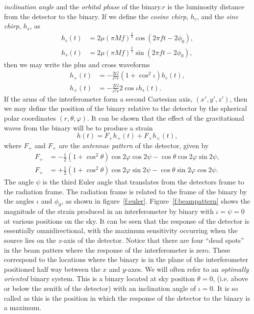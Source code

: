 \emph{inclination angle} and the \emph{orbital phase} of the binary.$r$ is the
luminosity distance from the detector to the binary.  If we define the
\emph{cosine chirp}, $h_c$,  and the \emph{sine chirp}, $h_s$, as 
\begin{align}
h_c(t) & = 2\mu (\pi M f)^{\frac{2}{3}} \cos(2\pi f t - 2\phi_0), \\
h_s(t) & = 2\mu (\pi M f)^{\frac{2}{3}} \sin(2\pi f t - 2\phi_0),
\end{align}
then we may write the plus and cross waveforms
\begin{align}
h_+(t) &= - \frac{2G}{c^2 r} (1 + \cos^2\iota) h_c(t), \\
h_\times(t) &= - \frac{2G}{c^2 r} 2\cos\iota h_s(t).
\end{align}
If the arms of the interferometer form a second Cartesian axis, $(x',y',z')$,
then we may define the position of the binary relative to the detector by the
spherical polar coordinates $(r,\theta,\varphi)$. It can be shown that the
effect of the gravitational waves from the binary will be to produce a
strain\cite{1987MNRAS.224..131S}
\begin{equation}
h(t) = F_+ h_+(t) + F_\times h_\times(t),
\end{equation}
where $F_+$ and $F_\times$ are the \emph{antennae pattern} of the detector,
given by
\begin{align}
F_+ &= -\frac{1}{2}(1 + \cos^2\theta) \cos 2\varphi \cos 2 \psi - 
\cos\theta \cos 2\varphi \sin 2\psi, \\
F_\times &= +\frac{1}{2}( 1 + \cos^2 \theta) \cos 2\varphi \sin 2\psi -
\cos\theta \sin 2\varphi \cos 2 \psi.
\end{align}
The angle $\psi$ is the third Euler angle that translates from the detectors
frame to the radiation frame. The radiation frame is related to the frame of
the binary by the angles $\iota$ and $\phi_0$, as shown in
figure~\ref{f:euler}. Figure~\ref{f:beampattern} shows the magnitude of the 
strain produced in an interferometer by binary with $\iota = \psi = 0$ at
various positions on the sky. It can be seen that the response of the
detector is essentially omnidirectional, with the maximum sensitivity
occurring when the source lies on the $z$-axis of the detector. Notice that
there are four ``dead spots'' in the beam patters where the response of the
interferometer is zero. These correspond to the locations where the binary is
in the plane of the interferometer positioned half way between the $x$ and
$y$-axes. We will often refer to an \emph{optimally oriented} binary system.
This is a binary located at sky position $\theta = 0$, (i.e. above or below
the zenith of the detector) with an inclination angle of $\iota = 0$. It is so
called as this is the position in which the response of the detector to the
binary is a maximum.

